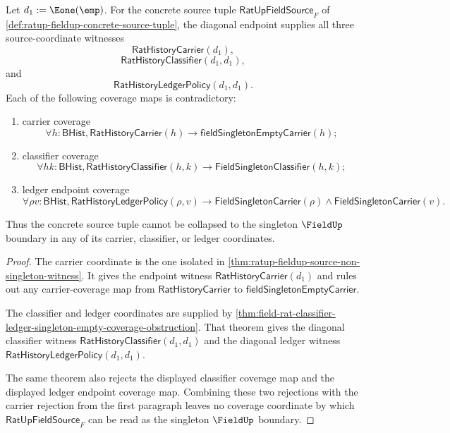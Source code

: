 \begin{theorem}
\label{thm:ratup-fieldup-source-coordinate-coverage-obstruction}
Let $d_1:=\Eone(\emp)$. For the concrete source tuple
$\mathsf{RatUpFieldSource}_F$ of
\autoref{def:ratup-fieldup-concrete-source-tuple}, the diagonal endpoint
supplies all three source-coordinate witnesses
$$
\mathsf{RatHistoryCarrier}(d_1),
$$
$$
\mathsf{RatHistoryClassifier}(d_1,d_1),
$$
and
$$
\mathsf{RatHistoryLedgerPolicy}(d_1,d_1).
$$
Each of the following coverage maps is contradictory:
\begin{enumerate}
  \item carrier coverage
  $$
  \forall h:\mathsf{BHist},\mathsf{RatHistoryCarrier}(h)\to
  \mathsf{fieldSingletonEmptyCarrier}(h);
  $$
  \item classifier coverage
  $$
  \forall h k:\mathsf{BHist},\mathsf{RatHistoryClassifier}(h,k)\to
  \mathsf{FieldSingletonClassifier}(h,k);
  $$
  \item ledger endpoint coverage
  $$
  \forall \rho v:\mathsf{BHist},\mathsf{RatHistoryLedgerPolicy}(\rho,v)\to
  \mathsf{FieldSingletonCarrier}(\rho)\land
  \mathsf{FieldSingletonCarrier}(v).
  $$
\end{enumerate}
Thus the concrete source tuple cannot be collapsed to the singleton
$\FieldUp$ boundary in any of its carrier, classifier, or ledger coordinates.
\end{theorem}
\begin{proof}
The carrier coordinate is the one isolated in
\autoref{thm:ratup-fieldup-source-non-singleton-witness}. It gives the endpoint
witness $\mathsf{RatHistoryCarrier}(d_1)$ and rules out any carrier-coverage
map from $\mathsf{RatHistoryCarrier}$ to
$\mathsf{fieldSingletonEmptyCarrier}$.

The classifier and ledger coordinates are supplied by
\autoref{thm:field-rat-classifier-ledger-singleton-empty-coverage-obstruction}.
That theorem gives the diagonal classifier witness
$\mathsf{RatHistoryClassifier}(d_1,d_1)$ and the diagonal ledger witness
$\mathsf{RatHistoryLedgerPolicy}(d_1,d_1)$.

The same theorem also rejects the displayed classifier coverage map and the
displayed ledger endpoint coverage map. Combining these two rejections with the
carrier rejection from the first paragraph leaves no coverage coordinate by
which $\mathsf{RatUpFieldSource}_F$ can be read as the singleton $\FieldUp$
boundary.
\end{proof}

